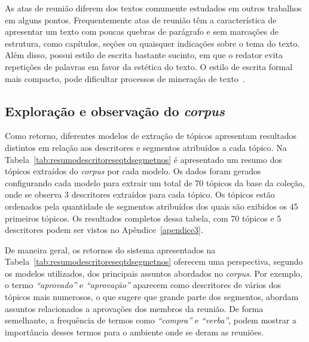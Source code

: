 As atas de reunião diferem dos textos comumente estudados em outros trabalhos em alguns pontos. Frequentemente atas de reunião têm a característica de apresentar um texto com poucas quebras de parágrafo e sem marcações de estrutura, como capítulos, seções ou quaisquer indicações sobre o tema do texto. Além disso, possui estilo de escrita bastante sucinto, em que o redator evita repetições de palavras em favor da estética do texto. O estilo de escrita formal mais compacto, pode dificultar processos de mineração de texto~\cite{Choi2001-LSA}.  %








\subsection{Exploração e observação do \textit{corpus}}

Como retorno, diferentes modelos de extração de tópicos apresentam resultados distintos em relação aos descritores e segmentos atribuídos a cada tópico. Na Tabela~\ref{tab:resumodescritoreseqtdsegmetnos} é apresentado um resumo dos tópicos extraídos do \textit{corpus} por cada modelo. Os dados foram gerados configurando cada modelo para extrair um total de 70 tópicos da base da coleção, onde se observa 3 descritores extraídos para cada tópico. Os tópicos estão ordenados pela quantidade de segmentos atribuídos dos quais são exibidos os 45 primeiros tópicos. Os resultados completos dessa tabela, com 70 tópicos e 5 descritores podem ser vistos no Apêndice~\ref{apendice3}.




\begin{landscape}%

\end{landscape}




De maneira geral, os retornos do sistema apresentados na Tabela~\ref{tab:resumodescritoreseqtdsegmetnos} oferecem uma perspectiva, segundo os modelos utilizados, dos principais assuntos abordados no \textit{corpus}. Por exemplo, o termo \textit{``aprovado''} e \textit{``aprovação''} aparecem como descritores de vários dos tópicos mais numerosos, o que sugere que grande parte dos segmentos, abordam assuntos relacionados a aprovações dos membros da reunião. De forma semelhante, a frequência de termos como \textit{``compra''} e \textit{``verba''}, podem mostrar a importância desses termos para o ambiente onde se deram as reuniões.


